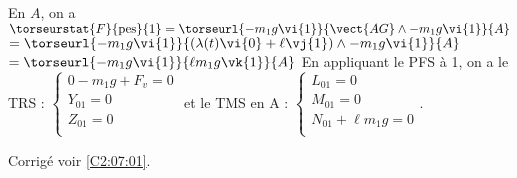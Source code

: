 \ifprof
En $A$, on a 
$\torseurstat{F}{\text{pes}}{1}=\torseurl{-m_1g\vi{1}}{\vect{AG}\wedge -m_1g\vi{1}}{A}$
$=\torseurl{-m_1g\vi{1}}{\left(\lambda(t)\vi{0}+\ell \vj{1} \right)\wedge -m_1g\vi{1}}{A}$
$=\torseurl{-m_1g\vi{1}}{\ell m_1g\vk{1}}{A}$
En appliquant le PFS à 1, on a le TRS :
$\left\{
\begin{array}{l}
0 -m_1 g   + F_v = 0 \\
Y_{01} =  0 \\
Z_{01} =  0 \\
\end{array}
\right.$
et le TMS en A :
$\left\{
\begin{array}{l}
L_{01} = 0 \\
M_{01} =  0 \\
N_{01} +\ell m_1g=  0 \\
\end{array}
\right.$.


\else
\fi



\ifprof
\else

\begin{flushright}
\footnotesize{Corrigé  voir \ref{C2:07:01}.}
\end{flushright}%
\fi


